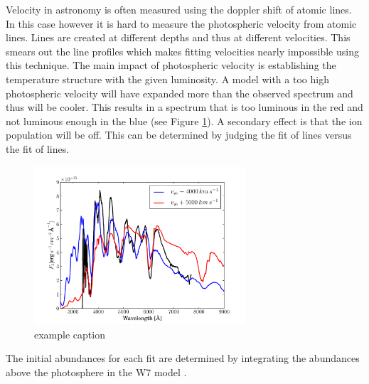 Velocity in astronomy is often measured using the doppler shift of atomic lines. In this case however it is hard to measure the photospheric velocity from atomic lines.  Lines are created at different depths and thus at different velocities. This smears out the line profiles which makes fitting velocities nearly impossible using this technique. The main impact of photospheric velocity is establishing the temperature structure with the given luminosity. A model with a too high photospheric velocity will have expanded more than the observed spectrum and thus will be cooler. This results in a spectrum that is too luminous in the red and not luminous enough in the blue (see Figure \ref{fig:sn2002bo_vph_offset}). 
A secondary effect is that the ion population will be off. This can be determined by judging the fit of  lines versus the fit of  lines. 
\begin{figure}[htbp] %
   \centering
   \includegraphics[width=0.7\textwidth]{chapter_dalek/plots/bf2002bo-10_vph.pdf} 
   \caption{example caption}
   \label{fig:sn2002bo_vph_offset}
\end{figure}


The initial abundances for each fit are determined by integrating the abundances above the photosphere in the W7 model \citep{1984ApJ...286..644N}.

